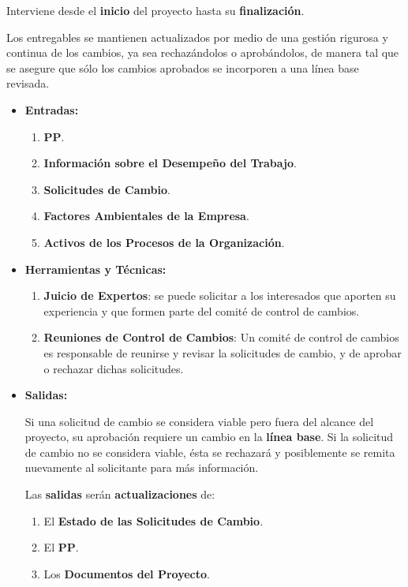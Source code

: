 \documentclass[10pt,a4paper]{article}
\begin{document}
\begin{itemize}
Interviene desde el \textbf{inicio} del proyecto hasta su \textbf{finalización}.

Los entregables se mantienen actualizados por medio de una gestión rigurosa y continua de los cambios, ya sea rechazándolos o aprobándolos, de manera tal que se asegure que sólo los cambios aprobados se incorporen a una línea base revisada.

\begin{itemize}
\item \textbf{Entradas:}
\begin{enumerate}
\item \textbf{PP}.
\item \textbf{Información sobre el Desempeño del Trabajo}.
\item \textbf{Solicitudes de Cambio}.
\item \textbf{Factores Ambientales de la Empresa}.
\item \textbf{Activos de los Procesos de la Organización}.
\end{enumerate}

\item \textbf{Herramientas y Técnicas:}
\begin{enumerate}
\item \textbf{Juicio de Expertos}: se puede solicitar a los interesados que aporten su experiencia y que formen parte del comité de control de cambios.
\item \textbf{Reuniones de Control de Cambios}: Un comité de control de cambios es responsable de reunirse y revisar la solicitudes de cambio, y de aprobar o rechazar dichas solicitudes.
\end{enumerate}

\item \textbf{Salidas:}

Si una solicitud de cambio se considera viable pero fuera del alcance del proyecto, su aprobación requiere un cambio en la \textbf{línea base}. Si la solicitud de cambio no se considera viable, ésta se rechazará y posiblemente se remita nuevamente al solicitante para más información.

Las \textbf{salidas} serán \textbf{actualizaciones} de:
\begin{enumerate}
\item El \textbf{Estado de las Solicitudes de Cambio}.
\item El \textbf{PP}.
\item Los \textbf{Documentos del Proyecto}.
\end{enumerate}
\end{itemize}


\end{itemize}
\end{document}
